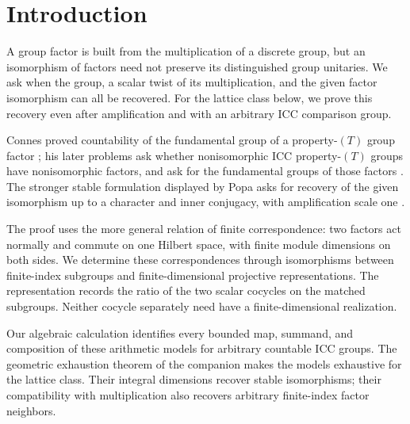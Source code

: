 \section{Introduction}\label{sec:introduction}
A group factor is built from the multiplication of a discrete group, but
an isomorphism of factors need not preserve its distinguished group
unitaries. We ask when the group, a scalar twist of its multiplication,
and the given factor isomorphism can all be recovered. For the lattice
class below, we prove this recovery even after amplification and with an
arbitrary ICC comparison group.

Connes proved countability of
the fundamental group of a property-$(T)$ group factor \cite{Connes1980};
his later problems ask whether nonisomorphic ICC property-$(T)$ groups
have nonisomorphic factors, and ask for the fundamental groups of those
factors \cite[Chapter V, Appendix B.$\varepsilon$, Problems 1--2]{Connes1994}.
The stronger stable formulation displayed by Popa asks for recovery of the
given isomorphism up to a character and inner conjugacy, with amplification
scale one \cite[Section 3, Equations (3.2) and (3.2$'$)]{Popa2007}.

The proof uses the more general relation of finite correspondence:
two factors act normally and commute on one Hilbert space, with finite
module dimensions on both sides. We determine these correspondences
through isomorphisms between finite-index subgroups and finite-dimensional
projective representations. The representation records the ratio of the
two scalar cocycles on the matched subgroups. Neither cocycle separately
need have a finite-dimensional realization.

Our algebraic calculation identifies every bounded map, summand, and
composition of these arithmetic models for arbitrary countable ICC groups.
The geometric exhaustion theorem of the companion
\cite[Theorem~1.2]{ArithmeticCompanion} makes the models exhaustive for the
lattice class. Their integral dimensions recover stable isomorphisms;
their compatibility with multiplication also recovers arbitrary
finite-index factor neighbors.

